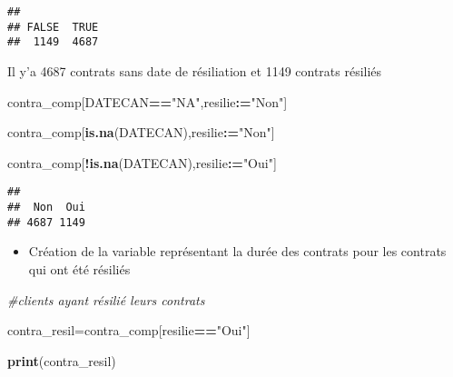\documentclass[
]{article}
\newenvironment{Shaded}{\begin{snugshade}}{\end{snugshade}}
\newcommand{\CommentTok}[1]{\textcolor[rgb]{0.56,0.35,0.01}{\textit{#1}}}
\newcommand{\ErrorTok}[1]{\textcolor[rgb]{0.64,0.00,0.00}{\textbf{#1}}}
\newcommand{\KeywordTok}[1]{\textcolor[rgb]{0.13,0.29,0.53}{\textbf{#1}}}
\newcommand{\NormalTok}[1]{#1}
\newcommand{\OperatorTok}[1]{\textcolor[rgb]{0.81,0.36,0.00}{\textbf{#1}}}
\newcommand{\StringTok}[1]{\textcolor[rgb]{0.31,0.60,0.02}{#1}}
\providecommand{\tightlist}{%
  \setlength{\itemsep}{0pt}\setlength{\parskip}{0pt}}
\begin{document}
\begin{verbatim}
## 
## FALSE  TRUE 
##  1149  4687
\end{verbatim}

Il y'a 4687 contrats sans date de résiliation et 1149 contrats résiliés

\begin{Shaded}
\begin{Highlighting}[]
\NormalTok{contra_comp[DATECAN}\OperatorTok{==}\StringTok{"NA"}\NormalTok{,resilie}\OperatorTok{:}\ErrorTok{=}\StringTok{"Non"}\NormalTok{]}
\end{Highlighting}
\end{Shaded}

\begin{Shaded}
\begin{Highlighting}[]
\NormalTok{contra_comp[}\KeywordTok{is.na}\NormalTok{(DATECAN),resilie}\OperatorTok{:}\ErrorTok{=}\StringTok{"Non"}\NormalTok{]}
\end{Highlighting}
\end{Shaded}

\begin{Shaded}
\begin{Highlighting}[]
\NormalTok{contra_comp[}\OperatorTok{!}\KeywordTok{is.na}\NormalTok{(DATECAN),resilie}\OperatorTok{:}\ErrorTok{=}\StringTok{"Oui"}\NormalTok{]}
\end{Highlighting}
\end{Shaded}

\begin{Shaded}
\end{Shaded}

\begin{verbatim}
## 
##  Non  Oui 
## 4687 1149
\end{verbatim}

\begin{itemize}
\tightlist
\item
  Création de la variable représentant la durée des contrats pour les
  contrats qui ont été résiliés
\end{itemize}

\begin{Shaded}
\begin{Highlighting}[]
\CommentTok{#clients ayant résilié leurs contrats}

\NormalTok{contra_resil=contra_comp[resilie}\OperatorTok{==}\StringTok{"Oui"}\NormalTok{]}

\KeywordTok{print}\NormalTok{(contra_resil)}
\end{Highlighting}
\end{Shaded}
\end{document}
